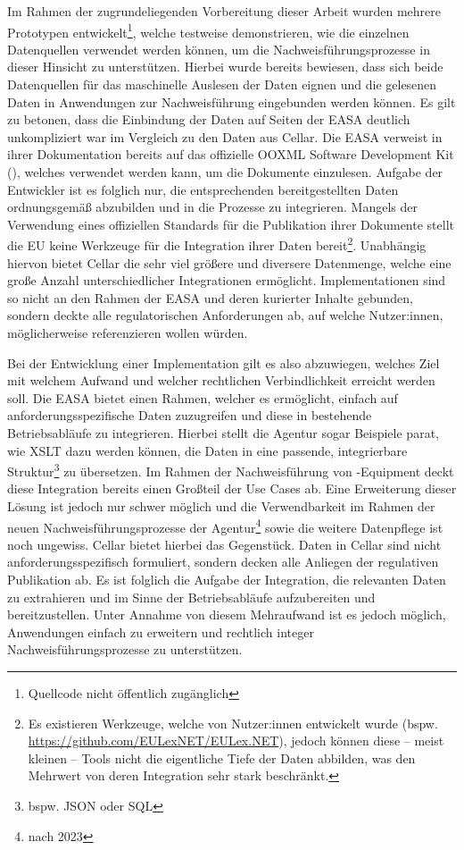     Im Rahmen der zugrundeliegenden Vorbereitung dieser Arbeit wurden mehrere Prototypen entwickelt\footnote{Quellcode nicht öffentlich zugänglich}, welche testweise demonstrieren, wie die einzelnen Datenquellen verwendet werden können, um die Nachweisführungsprozesse in dieser Hinsicht zu unterstützen.
    Hierbei wurde bereits bewiesen, dass sich beide Datenquellen für das maschinelle Auslesen der Daten eignen und die gelesenen Daten in Anwendungen zur Nachweisführung eingebunden werden können.
    Es gilt zu betonen, dass die Einbindung der Daten auf Seiten der \ac{EASA} deutlich unkompliziert war im Vergleich zu den Daten aus Cellar.
    Die \ac{EASA} verweist in ihrer Dokumentation bereits auf das offizielle \ac{OOXML} Software Development Kit (), welches verwendet werden kann, um die Dokumente einzulesen.
    Aufgabe der Entwickler ist es folglich nur, die entsprechenden bereitgestellten Daten ordnungsgemäß abzubilden und in die Prozesse zu integrieren.
    Mangels der Verwendung eines offiziellen Standards für die Publikation ihrer Dokumente stellt die \ac{EU} keine Werkzeuge für die Integration ihrer Daten bereit\footnote{Es existieren Werkzeuge, welche von Nutzer:innen entwickelt wurde (bspw. \href{https://github.com/EULexNET/EULex.NET}{https://github.com/EULexNET/EULex.NET}), jedoch können diese -- meist kleinen -- Tools nicht die eigentliche Tiefe der Daten abbilden, was den Mehrwert von deren Integration sehr stark beschränkt.}.
    Unabhängig hiervon bietet Cellar die sehr viel größere und diversere Datenmenge, welche eine große Anzahl unterschiedlicher Integrationen ermöglicht.
    Implementationen sind so nicht an den Rahmen der \ac{EASA} und deren kurierter Inhalte gebunden, sondern deckte alle regulatorischen Anforderungen ab, auf welche Nutzer:innen, möglicherweise referenzieren wollen würden.
    
    \medskip
    Bei der Entwicklung einer Implementation gilt es also abzuwiegen, welches Ziel mit welchem Aufwand und welcher rechtlichen Verbindlichkeit erreicht werden soll.
    Die \ac{EASA} bietet einen Rahmen, welcher es ermöglicht, einfach auf anforderungsspezifische Daten zuzugreifen und diese in bestehende Betriebsabläufe zu integrieren.
    Hierbei stellt die Agentur sogar Beispiele parat, wie \ac{XSLT} dazu werden können, die Daten in eine passende, integrierbare Struktur\footnote{bspw. JSON oder SQL} zu übersetzen.
    Im Rahmen der Nachweisführung von \atmans-Equipment deckt diese Integration bereits einen Großteil der Use Cases ab.
    Eine Erweiterung dieser Lösung ist jedoch nur schwer möglich und die Verwendbarkeit im Rahmen der neuen Nachweisführungsprozesse der Agentur\footnote{nach 2023} sowie die weitere Datenpflege ist noch ungewiss.
    Cellar bietet hierbei das Gegenstück. Daten in Cellar sind nicht anforderungsspezifisch formuliert, sondern decken alle Anliegen der regulativen Publikation ab.
    Es ist folglich die Aufgabe der Integration, die relevanten Daten zu extrahieren und im Sinne der Betriebsabläufe aufzubereiten und bereitzustellen.
    Unter Annahme von diesem Mehraufwand ist es jedoch möglich, Anwendungen einfach zu erweitern und rechtlich integer Nachweisführungsprozesse zu unterstützen.

